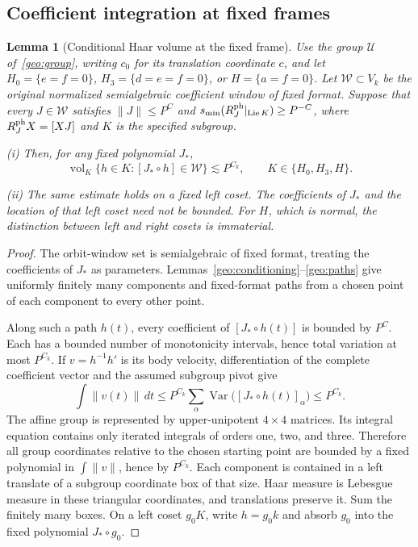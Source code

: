 \documentclass[11pt]{amsart}
\newtheorem{lemma}[theorem]{Lemma}
\theoremstyle{definition}
\theoremstyle{remark}
\numberwithin{equation}{section}
\begin{document}
\subsection{Coefficient integration at fixed frames}\label{atlas:fixed-frame-integration}

\begin{lemma}[Conditional Haar volume at the fixed frame]\label{surf:haar}\label{low:4:sf:lem:haar}
Use the group $\mathcal U$ of~\eqref{geo:group}, writing $c_0$ for its translation coordinate $c$, and let $H_0=\{e=f=0\}$, $H_3=\{d=e=f=0\}$, or $H=\{a=f=0\}$. Let $\mathcal W\subset V_k$ be the original normalized semialgebraic coefficient window of fixed format. Suppose that every $J\in\mathcal W$ satisfies $\|J\|\le P^C$ and $s_{\min}(R_J^{\rm ph}|_{\operatorname{Lie}K})\ge P^{-C}$, where $R_J^{\rm ph}X=[XJ]$ and $K$ is the specified subgroup.

\noindent\textup{(i)} Then, for any fixed polynomial $J_*$,
\[
 \operatorname{vol}_{K}\{h\in K:[J_*\circ h]\in\mathcal W\}\lesssim P^{C_k},\qquad K\in\{H_0,H_3,H\}.
\]

\noindent\textup{(ii)} The same estimate holds on a fixed left coset. The coefficients of $J_*$ and the location of that left coset need not be bounded. For $H$, which is normal, the distinction between left and right cosets is immaterial.
\end{lemma}
\begin{proof}
The orbit-window set is semialgebraic of fixed format, treating the coefficients of $J_*$ as parameters. Lemmas~\ref{geo:conditioning}--\ref{geo:paths} give uniformly finitely many components and fixed-format paths from a chosen point of each component to every other point.

Along such a path $h(t)$, every coefficient of $[J_*\circ h(t)]$ is bounded by $P^C$. Each has a bounded number of monotonicity intervals, hence total variation at most $P^{C_k}$. If $v=h^{-1}h'$ is its body velocity, differentiation of the complete coefficient vector and the assumed subgroup pivot give
\[
 \int\|v(t)\|\,dt\le P^{C_k}\sum_{\alpha}\operatorname{Var}\bigl([J_*\circ h(t)]_\alpha\bigr)\le P^{C_k}.
\]
The affine group is represented by upper-unipotent $4\times4$ matrices. Its integral equation contains only iterated integrals of orders one, two, and three. Therefore all group coordinates relative to the chosen starting point are bounded by a fixed polynomial in $\int\|v\|$, hence by $P^{C_k}$. Each component is contained in a left translate of a subgroup coordinate box of that size. Haar measure is Lebesgue measure in these triangular coordinates, and translations preserve it. Sum the finitely many boxes. On a left coset $g_0K$, write $h=g_0k$ and absorb $g_0$ into the fixed polynomial $J_*\circ g_0$. 
\end{proof}
\end{document}
